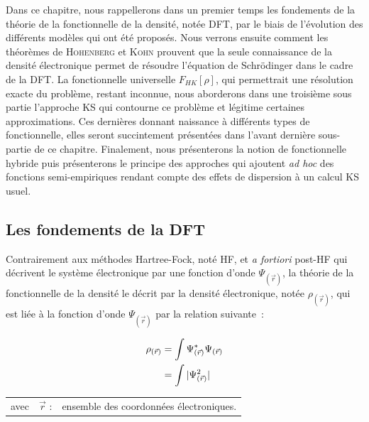 Dans ce chapitre, nous rappellerons dans un premier temps les fondements de la théorie de la fonctionnelle de la densité, notée DFT, par le biais de l'évolution des différents modèles qui ont été proposés. Nous verrons ensuite comment les théorèmes de \textsc{Hohenberg} et \textsc{Kohn} prouvent que la seule connaissance de la densité électronique permet de résoudre l'équation de Schr\"{o}dinger dans le cadre de la DFT. La fonctionnelle universelle $F_{HK}[\rho]$, qui permettrait une résolution exacte du problème, restant inconnue, nous aborderons dans une troisième sous partie l'approche KS qui contourne ce problème et légitime certaines approximations. Ces dernières donnant naissance à différents types de fonctionnelle, elles seront succintement présentées dans l’avant dernière sous-partie de ce chapitre. Finalement, nous présenterons la notion de fonctionnelle hybride puis présenterons le principe des approches qui ajoutent \textit{ad hoc} des fonctions semi-empiriques rendant compte des effets de dispersion à un calcul KS usuel.

\subsection{Les fondements de la DFT}

Contrairement aux méthodes Hartree-Fock, noté HF, et \textit{a fortiori} post-HF qui décrivent le système électronique par une fonction d'onde $\Psi_{(\vec{r})}$, la théorie de la fonctionnelle de la densité le décrit par la densité électronique, notée $\rho_{(\vec{r})}$, qui est liée à la fonction d'onde $\Psi_{(\vec{r})}$ par la relation suivante~:

\begin{align}
\rho_{(\vec{r})} &= \int \Psi_{(\vec{r})}^{*} \Psi_{(\vec{r})} \\
&= \int |\Psi_{(\vec{r})}^{2}| \notag
\end{align}

\begin{flushleft}
\begin{tabular}{@{}lrp{10cm}}
avec & $\vec{r}$ : & ensemble des coordonnées électroniques. 
\end{tabular}
\end{flushleft}


